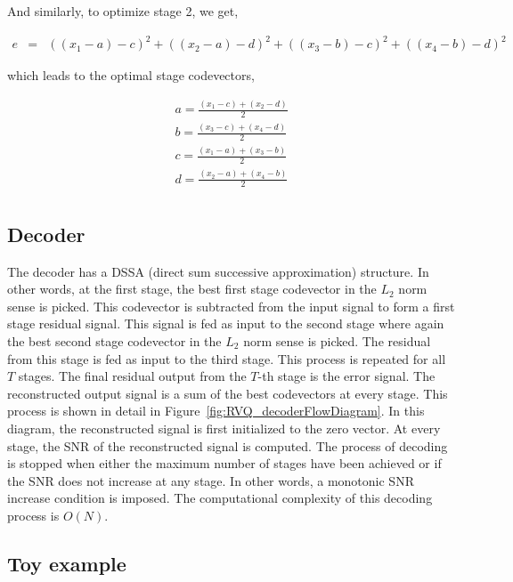 And similarly, to optimize stage 2, we get,

\begin{equation}
\begin{array}{lllll}
e &=& {((x_1 - a) - c)}^2 + {((x_2- a) - d)}^2 + {((x_3 - b) - c)}^2 + {((x_4 - b) - d)}^2
\end{array}
\label{Eqn:2x2RVQ_stage2}
\end{equation}

which leads to the optimal stage codevectors,

\begin{equation}
\begin{array}{lllll}
a = \frac{(x_1 - c) + (x_2 - d)}{2}\\
b = \frac{(x_3 - c) + (x_4 - d)}{2}\\
c = \frac{(x_1 - a) + (x_3 - b)}{2}\\
d = \frac{(x_2 - a) + (x_4 - b)}{2}\\
\end{array}
\end{equation}

\subsection{Decoder}
The decoder has a DSSA (direct sum successive approximation) structure.  In other words, at the first stage, the best first stage codevector in the $L_2$ norm sense is picked.  This codevector is subtracted from the input signal to form a first stage residual signal.  This signal is fed as input to the second stage where again the best second stage codevector in the $L_2$ norm sense is picked.  The residual from this stage is fed as input to the third stage.  This process is repeated for all $T$ stages.  The final residual output from the $T$-th stage is the error signal.  The reconstructed output signal is a sum of the best codevectors at every stage.  This process is shown in detail in Figure~\ref{fig:RVQ_decoderFlowDiagram}.  In this diagram, the reconstructed signal is first initialized to the zero vector.  At every stage, the SNR of the reconstructed signal is computed.  The process of decoding is stopped when either the maximum number of stages have been achieved or if the SNR does not increase at any stage.  In other words, a monotonic SNR increase condition is imposed.  The computational complexity of this decoding process is $O(N)$.  


\subsection{Toy example}



